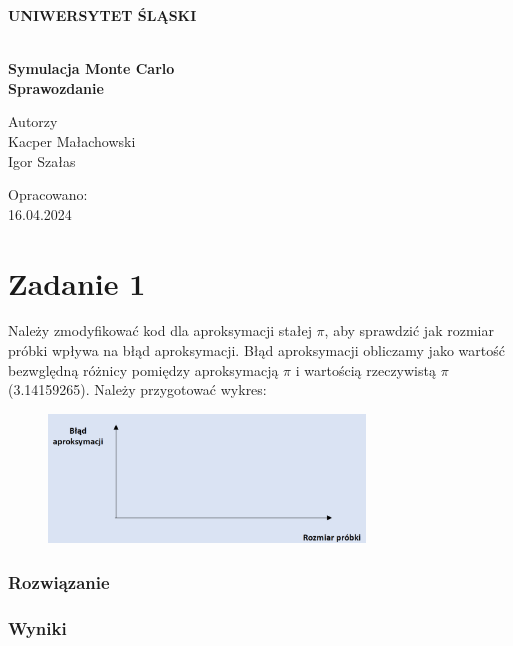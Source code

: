 \documentclass[12pt,oneside,a4paper]{book} %
\theoremstyle{break}
\begin{document}
\thispagestyle{empty}
\begin{center}
  \Large
  \bf{UNIWERSYTET ŚLĄSKI}\\
  \bf{}\\[25mm]
  \large

  \bf{Symulacja Monte Carlo}\\[35mm]

  Sprawozdanie\\[25mm]
\end{center}
\begin{flushright}
  \large
  Autorzy\\
  Kacper Małachowski\\
  Igor Szałas\\[25mm]
\end{flushright}
\begin{center}
  Opracowano:\\
  16.04.2024
\end{center}

\chapter*{Zadanie 1}

Należy zmodyfikować kod dla aproksymacji stałej $\pi$, aby sprawdzić jak rozmiar próbki wpływa na błąd aproksymacji. Błąd aproksymacji obliczamy jako wartość bezwględną różnicy pomiędzy aproksymacją $\pi$ i wartością rzeczywistą $\pi$ (3.14159265). Należy przygotować wykres:

\begin{figure}[H]
  \centering
  \includegraphics[width=0.75\textwidth]{chart_from_instruction.png}
\end{figure}

\subsection*{Rozwiązanie}

\subsection*{Wyniki}
\end{document}
